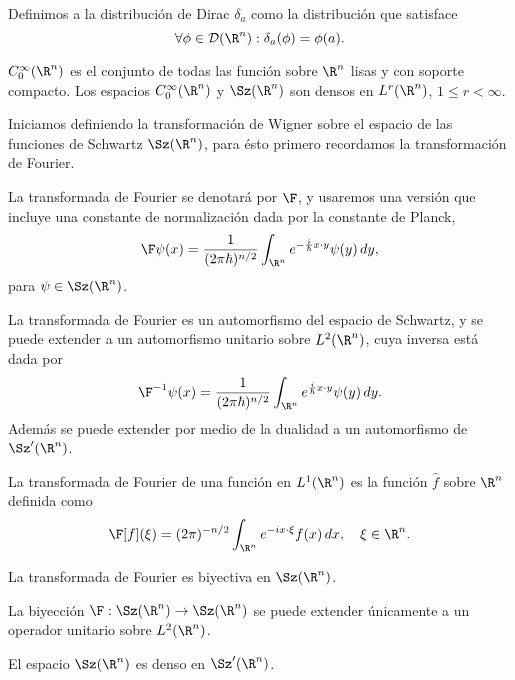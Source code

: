 \begin{definition}
  Definimos a la distribución de Dirac $\delta_a$ como la
  distribución que satisface
  \[
    \forall \phi \in \mathcal D(\R^{n}) : \delta_a(\phi) =
    \phi(a).
  \] 
\end{definition}

$C^{\infty}_0(\R^{n})$ es el conjunto de todas las función
sobre $\R^{n}$ lisas y con soporte compacto. Los espacios
$C^{\infty}_0(\R^{n})$ y $\Sz(\R^{n})$ son densos en
$L^{r}(\R^{n})$, $1 \leq r < \infty$.

Iniciamos definiendo
la transformación de Wigner sobre el espacio de las
funciones de Schwartz $\Sz(\R^{n})$, para ésto primero
recordamos la transformación de Fourier.

\begin{definition}
  La transformada de Fourier se denotará por $\F$,
  y usaremos una versión que incluye una constante de
  normalización dada por la constante de Planck,
  \[
    \F\psi(x)
    = \frac{1}{(2\pi\hbar)^{n / 2}} \int_{\R^{n}}
    e^{-\frac{i}{\hbar} x \cdot y} \psi(y) \, dy,
  \] 
  para $\psi \in \Sz(\R^{n})$.
\end{definition}
La transformada de Fourier es un automorfismo del espacio
de Schwartz, y se puede extender a un automorfismo
unitario sobre $L^2(\R^{n})$, cuya inversa está dada por
\[
  \F^{-1}\psi(x)
  = \frac{1}{(2\pi\hbar)^{n / 2}} \int_{\R^{n}}
  e^{\frac{i}{\hbar} x \cdot y} \psi(y) \, dy.
\] 
Además se puede extender por medio de la dualidad a un
automorfismo de $\Sz'(\R^{n})$.

\begin{definition}
  La transformada de Fourier de una función en
  $L^{1}(\R^{n})$ es la función $\hat{f}$ sobre $\R^{n}$ 
  definida como
  \[
    \F[f](\xi) = (2\pi)^{-n / 2} \int_{\R^{n}} e^{-i x
    \cdot \xi} f(x) \, dx, 
    \quad \xi \in \R^{n}.
  \] 
\end{definition}

\begin{theorem}
  La transformada de Fourier es biyectiva en
  $\Sz(\R^{n})$.
\end{theorem}

\begin{theorem}[Plancherel]
  La biyección $\F : \Sz(\R^{n}) \to \Sz(\R^{n})$ 
  se puede extender únicamente a un operador unitario
  sobre $L^2(\R^{n})$.
\end{theorem}

\begin{proposition}
  El espacio $\Sz(\R^{n})$ es denso en $\Sz'(\R^{n})$.
\end{proposition}

